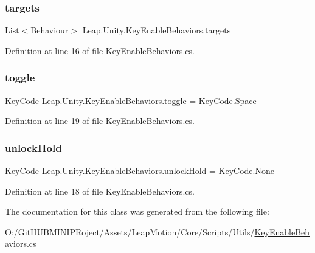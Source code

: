 \subsubsection{\texorpdfstring{targets}{targets}}
{\footnotesize\ttfamily List$<$Behaviour$>$ Leap.\+Unity.\+Key\+Enable\+Behaviors.\+targets}



Definition at line 16 of file Key\+Enable\+Behaviors.\+cs.

\mbox{\label{class_leap_1_1_unity_1_1_key_enable_behaviors_ab05b7eb135878da560c5b37406577483}} 
\subsubsection{\texorpdfstring{toggle}{toggle}}
{\footnotesize\ttfamily Key\+Code Leap.\+Unity.\+Key\+Enable\+Behaviors.\+toggle = Key\+Code.\+Space}



Definition at line 19 of file Key\+Enable\+Behaviors.\+cs.

\mbox{\label{class_leap_1_1_unity_1_1_key_enable_behaviors_ae5f7592ef59f6b20ac63df7edebe83cd}} 
\subsubsection{\texorpdfstring{unlockHold}{unlockHold}}
{\footnotesize\ttfamily Key\+Code Leap.\+Unity.\+Key\+Enable\+Behaviors.\+unlock\+Hold = Key\+Code.\+None}



Definition at line 18 of file Key\+Enable\+Behaviors.\+cs.



The documentation for this class was generated from the following file\+:\begin{DoxyCompactItemize}
\item 
O\+:/\+Git\+H\+U\+B\+M\+I\+N\+I\+P\+Roject/\+Assets/\+Leap\+Motion/\+Core/\+Scripts/\+Utils/\mbox{\hyperlink{_key_enable_behaviors_8cs}{Key\+Enable\+Behaviors.\+cs}}\end{DoxyCompactItemize}
